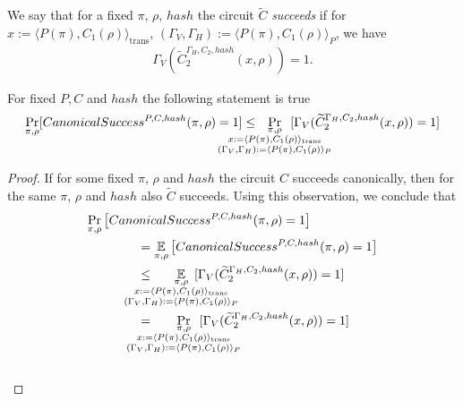 We say that for a fixed $\pi$, $\rho$, $hash$ the circuit $\widetilde{C}$ \textit{succeeds} if
for $x := \langle P(\pi), C_1(\rho) \rangle_{\text{trans}}$,
$(\Gamma_V, \Gamma_H) := \langle P(\pi), C_1(\rho) \rangle_{P}$, we have
\begin{align*}
\Gamma_V(\widetilde{C}_2^{\Gamma_H, C_2, hash}(x, \rho)) = 1.
\end{align*}
%
\begin{lemma}
  \label{lemma:ctilda_c}
  For fixed $P, C$ and $hash$ the following statement is true
  \begin{align*}
    \underset{\pi, \rho}{\Pr}[CanonicalSuccess^{P, C, hash}(\pi, \rho) = 1]
    \leq
    \mkern13mu
    \underset{
      \mathclap{
      \substack{
        \pi, \rho \\
        x := \langle P(\pi), C_1(\rho) \rangle_{\text{trans}} \\
        (\Gamma_V, \Gamma_H) := \langle P(\pi), C_1(\rho) \rangle_{P}
      }}} {\Pr}\mkern13mu[\Gamma_V(\widetilde{C}_2^{\Gamma_H, C_2, hash}(x, \rho)) = 1]
  \end{align*}
\end{lemma}
%
\begin{proof}
If for some fixed $\pi$, $\rho$ and $hash$ the circuit $C$ succeeds canonically, then for the same $\pi$, $\rho$ and $hash$ also $\widetilde{C}$ succeeds.
Using this observation, we conclude that
\begin{align*}
  &\underset{\pi, \rho}{\Pr}\left[CanonicalSuccess^{P, C, hash}(\pi, \rho) = 1\right] \\
  &\IndII = \underset{\pi, \rho}{\mathbb{E}}\left[CanonicalSuccess^{P, C, hash}(\pi, \rho) = 1 \right] \\
  &\IndII \leq
  \mkern33mu
    \underset{
      \mathclap{
        \substack{\pi, \rho \\
        x := \langle P(\pi), C_1(\rho) \rangle_{\text{trans}} \\
        (\Gamma_V, \Gamma_H) := \langle P(\pi), C_1(\rho) \rangle_{P}
      }}}
    {\mathbb{E}}\mkern13mu[\Gamma_V(\widetilde{C}_2^{\Gamma_H, C_2, hash}(x, \rho)) = 1] \\
  &\IndII =
  \mkern33mu
    \underset{
      \mathclap{
        \substack{\pi, \rho \\
        x := \langle P(\pi), C_1(\rho) \rangle_{\text{trans}} \\
        (\Gamma_V, \Gamma_H) := \langle P(\pi), C_1(\rho) \rangle_{P}
      }}}
    {\Pr}\mkern13mu[\Gamma_V(\widetilde{C}_2^{\Gamma_H, C_2, hash}(x, \rho)) = 1]
\end{align*}
\\\text{  }
\end{proof}
